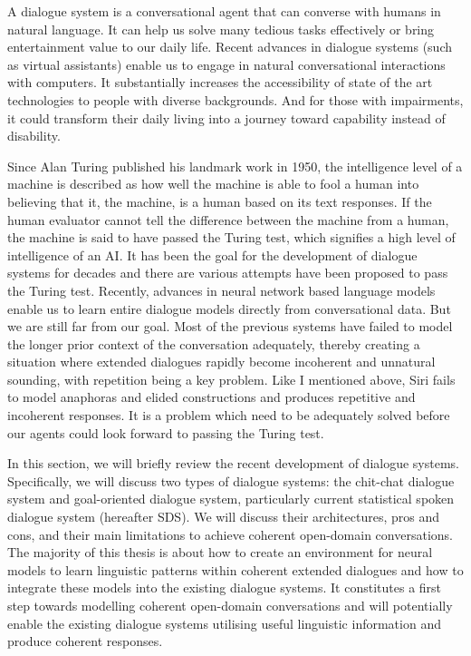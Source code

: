 \documentclass[bsc,frontabs,twoside,singlespacing,parskip,deptreport]{infthesis}     %
\begin{document}
A dialogue system is a conversational agent that can converse with humans in natural language. It can help us solve many tedious tasks effectively or bring entertainment value to our daily life. Recent advances in dialogue systems (such as virtual assistants) enable us to engage in natural conversational interactions with computers. It substantially increases the accessibility of state of the art technologies to people with diverse backgrounds. And for those with impairments, it could transform their daily living into a journey toward capability instead of disability.

Since Alan Turing published his landmark work in 1950\cite{turing1950computing}, the intelligence level of a machine is described as how well the machine is able to fool a human into believing that it, the machine, is a human based on its text responses. If the human evaluator cannot tell the difference between the machine from a human, the machine is said to have passed the Turing test, which signifies a high level of intelligence of an AI. It has been the goal for the development of dialogue systems for decades and there are various attempts have been proposed to pass the Turing test. Recently, advances in neural network based language models enable us to learn entire dialogue models directly from conversational data. But we are still far from our goal. Most of the previous systems have failed to model the longer prior context of the conversation adequately, thereby creating a situation where extended dialogues rapidly become incoherent and unnatural sounding, with repetition being a key problem. Like I mentioned above, Siri fails to model anaphoras and elided constructions and produces repetitive and incoherent responses. It is a problem which need to be adequately solved before our agents could look forward to passing the Turing test.

In this section, we will briefly review the recent development of dialogue systems. Specifically, we will discuss two types of dialogue systems: the chit-chat dialogue system and goal-oriented dialogue system, particularly current statistical spoken dialogue system (hereafter SDS). We will discuss their architectures, pros and cons, and their main limitations to achieve coherent open-domain conversations. The majority of this thesis is about how to create an environment for neural models to learn linguistic patterns within coherent extended dialogues and how to integrate these models into the existing dialogue systems. It constitutes a first step towards modelling coherent open-domain conversations and will potentially enable the existing dialogue systems utilising useful linguistic information and produce coherent responses.
\end{document}
